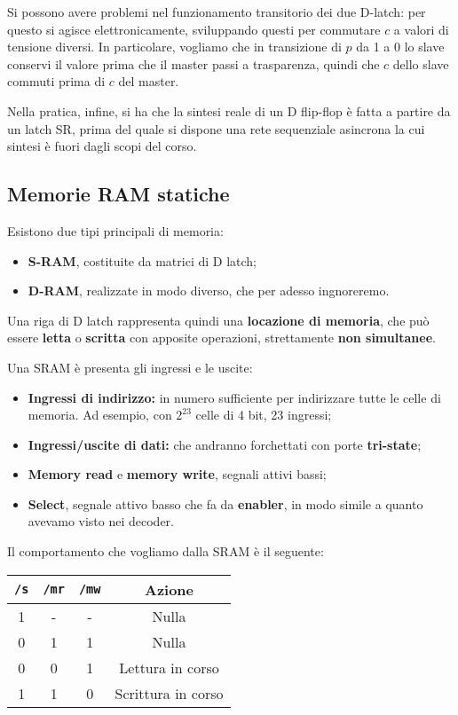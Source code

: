 \documentclass[a4paper,11pt]{article}
\begin{document}
Si possono avere problemi nel funzionamento transitorio dei due D-latch: per questo si agisce elettronicamente, sviluppando questi per commutare $c$ a valori di tensione diversi.
In particolare, vogliamo che in transizione di $p$ da 1 a 0 lo slave conservi il valore prima che il master passi a trasparenza, quindi che $c$ dello slave commuti prima di $c$ del master.

Nella pratica, infine, si ha che la sintesi reale di un D flip-flop è fatta a partire da un latch SR, prima del quale si dispone una rete sequenziale asincrona la cui sintesi è fuori dagli scopi del corso.

\subsection{Memorie RAM statiche}
Esistono due tipi principali di memoria:
\begin{itemize}
	\item \textbf{S-RAM}, costituite da matrici di D latch;
	\item \textbf{D-RAM}, realizzate in modo diverso, che per adesso ingnoreremo. 
\end{itemize}

Una riga di D latch rappresenta quindi una \textbf{locazione di memoria}, che può essere \textbf{letta} o \textbf{scritta} con apposite operazioni, strettamente \textbf{non simultanee}.

Una SRAM è presenta gli ingressi e le uscite:
\begin{itemize}
	\item \textbf{Ingressi di indirizzo:} in numero sufficiente per indirizzare tutte le celle di memoria. Ad esempio, con $2^{23}$ celle di 4 bit, 23 ingressi;
	\item \textbf{Ingressi/uscite di dati:} che andranno forchettati con porte \textbf{tri-state};
	\item \textbf{Memory read} e \textbf{memory write}, segnali attivi bassi;
	\item \textbf{Select}, segnale attivo basso che fa da \textbf{enabler}, in modo simile a quanto avevamo visto nei decoder.
\end{itemize}

Il comportamento che vogliamo dalla SRAM è il seguente:
\begin{table}[h!]
	\center {}
	\begin{tabular} { c | c | c || c }
		\bfseries \lstinline|/s| & \bfseries \lstinline|/mr| & \bfseries \lstinline|/mw| & \bfseries Azione \\
		\hline 
		1 & - & - & Nulla \\ 
		0 & 1 & 1 & Nulla \\ 
		0 & 0 & 1 & Lettura in corso \\ 
		1 & 1 & 0 & Scrittura in corso \\ 
	\end{tabular}
\end{table}
\end{document}
